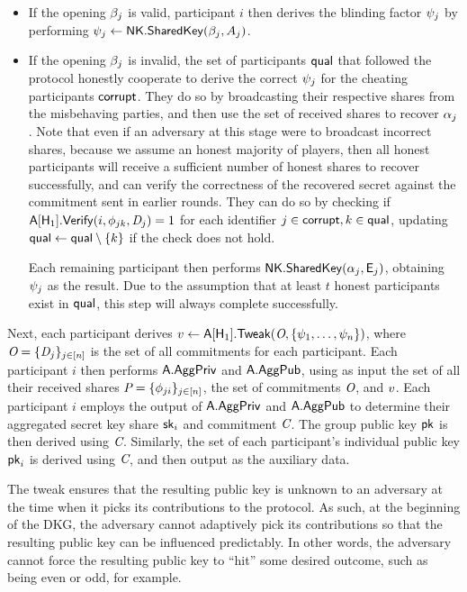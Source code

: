 \begin{itemize}
  \item If the opening $\beta_j$ is valid,
participant $i$ then derives the blinding factor $\psi_j$ by performing $\psi_j \gets \mathsf{NK}.\mathsf{SharedKey}(\beta_j, A_j)$.
  \item If the opening $\beta_j$ is invalid,
the set of participants $\mathsf{qual}$ that followed the protocol honestly cooperate to derive the correct $\psi_j$ for the cheating participants $\mathsf{corrupt}$.
They do so by broadcasting their respective shares from the misbehaving parties,
and then use the set of received shares to recover $\alpha_j$.
Note that even if an adversary at this stage were to broadcast incorrect shares,
because we assume an honest majority of players,
then all honest participants will receive a sufficient number of honest shares to recover successfully,
and can verify the correctness of the recovered secret against the commitment sent in earlier rounds.
They can do so
by checking if $\mathsf{A}[\mathsf{H}_1].\mathsf{Verify}(i, \phi_{jk}, \textit{D}_j) = 1$
for each identifier $j \in \mathsf{corrupt}, k \in \mathsf{qual}$,
updating $\mathsf{qual} \gets \mathsf{qual} \setminus \{ k\}$ if the check does not hold.

Each remaining participant then performs $\mathsf{NK}.\mathsf{SharedKey}(\alpha_j, \mathsf{E}_j)$,
obtaining $\psi_j$ as the result.
Due to the assumption that at least $t$ honest participants exist in $\mathsf{qual}$,
this step will always complete successfully.
\end{itemize}

Next, each participant derives $v \gets \mathsf{A}[\mathsf{H}_1].\mathsf{Tweak}(\textit{O}, \{\psi_1, \ldots, \psi_n \})$,
where  $\textit{O} = \{\textit{D}_j \}_{j \in [n]}$ is the set of all \AVSS commitments for each participant.
Each participant $i$ then performs $\mathsf{A}.\mathsf{AggPriv}$ and $\mathsf{A}.\mathsf{AggPub}$,
using as input the set of all their received shares $\textit{P} = \{\phi_{ji} \}_{j \in [n]}$,
the set of \AVSS commitments $\textit{O}$,
and $v$.
Each participant $i$ employs the output of $\mathsf{A}.\mathsf{AggPriv}$ and
$\mathsf{A}.\mathsf{AggPub}$ to determine their aggregated secret key share $\mathsf{sk}_i$ and commitment $\textit{C}$.
The group public key $\mathsf{pk}$ is then derived using $\textit{C}$.
Similarly, the set of each participant's individual public key $\mathsf{pk}_i$ is derived using $\textit{C}$,
and then output as the auxiliary data.

The tweak ensures that the resulting public key is unknown to
an adversary at the time when it picks its contributions to the protocol. As
such, at the beginning of the DKG, the adversary cannot adaptively pick its
contributions so that the resulting public key can be influenced predictably.
In other words, the adversary cannot force the resulting public key to ``hit''
some desired outcome, such as being even or odd, for example.

